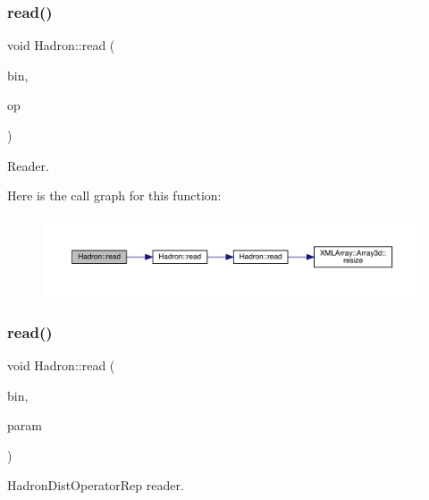 \subsubsection{\texorpdfstring{read()}{read()}\hspace{0.1cm}{\footnotesize\ttfamily [89/94]}}
{\footnotesize\ttfamily void Hadron\+::read (\begin{DoxyParamCaption}\item[{\mbox{\hyperlink{classADATIO_1_1BinaryReader}{Binary\+Reader}} \&}]{bin,  }\item[{\mbox{\hyperlink{structHadron_1_1KeySingleHadronQuarkDeriv__t}{Key\+Single\+Hadron\+Quark\+Deriv\+\_\+t}} \&}]{op }\end{DoxyParamCaption})}



Reader. 

Here is the call graph for this function\+:
\nopagebreak
\begin{figure}[H]
\begin{center}
\leavevmode
\includegraphics[width=350pt]{d1/daf/namespaceHadron_a14726c9fa76350682d7ef85457af512b_cgraph}
\end{center}
\end{figure}
\mbox{\label{namespaceHadron_adeba574c3428db28a2e7054d5f4d32d6}} 
\subsubsection{\texorpdfstring{read()}{read()}\hspace{0.1cm}{\footnotesize\ttfamily [90/94]}}
{\footnotesize\ttfamily void Hadron\+::read (\begin{DoxyParamCaption}\item[{\mbox{\hyperlink{classADATIO_1_1BinaryReader}{Binary\+Reader}} \&}]{bin,  }\item[{\mbox{\hyperlink{classHadron_1_1HadronDistOperatorRep__t}{Hadron\+Dist\+Operator\+Rep\+\_\+t}} \&}]{param }\end{DoxyParamCaption})}



Hadron\+Dist\+Operator\+Rep reader. 

